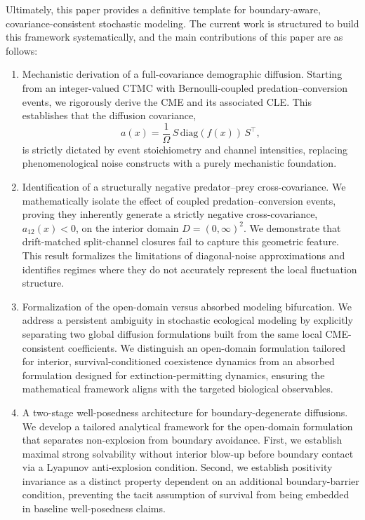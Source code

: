 \documentclass[pdflatex,sn-mathphys-ay]{sn-jnl}
\theoremstyle{thmstyleone}
\theoremstyle{definition}
\theoremstyle{remark}
\begin{document}
Ultimately, this paper provides a definitive template for boundary-aware, covariance-consistent stochastic modeling.
The current work is structured to build this framework systematically, and the main contributions of this paper are as follows:
\begin{enumerate}[label=(C\arabic*)]
\item Mechanistic derivation of a full-covariance demographic diffusion.
Starting from an integer-valued CTMC with Bernoulli-coupled predation--conversion events, we rigorously derive the CME and its associated CLE. 
This establishes that the diffusion covariance,
\[
a(x)=\frac{1}{\Omega}\,S\,\mathrm{diag}(f(x))\,S^\top,
\]
is strictly dictated by event stoichiometry and channel intensities, replacing phenomenological noise constructs with a purely mechanistic foundation.
\item Identification of a structurally negative predator--prey cross-covariance.
We mathematically isolate the effect of coupled predation--conversion events, proving they inherently generate a strictly negative cross-covariance, $a_{12}(x) < 0$, on the interior domain $D = (0,\infty)^2$. 
We demonstrate that drift-matched split-channel closures fail to capture this geometric feature. This result formalizes the limitations of diagonal-noise approximations and identifies regimes where they do not accurately represent the local fluctuation structure.
\item Formalization of the open-domain versus absorbed modeling bifurcation.
We address a persistent ambiguity in stochastic ecological modeling by explicitly separating two global diffusion formulations built from the same local CME-consistent coefficients. 
We distinguish an open-domain formulation tailored for interior, survival-conditioned coexistence dynamics from an absorbed formulation designed for extinction-permitting dynamics, ensuring the mathematical framework aligns with the targeted biological observables.
\item A two-stage well-posedness architecture for boundary-degenerate diffusions.
We develop a tailored analytical framework for the open-domain formulation that separates non-explosion from boundary avoidance. 
First, we establish maximal strong solvability without interior blow-up before boundary contact via a Lyapunov anti-explosion condition. 
Second, we establish positivity invariance as a distinct property dependent on an additional boundary-barrier condition, preventing the tacit assumption of survival from being embedded in baseline well-posedness claims.
\end{enumerate}
\end{document}
